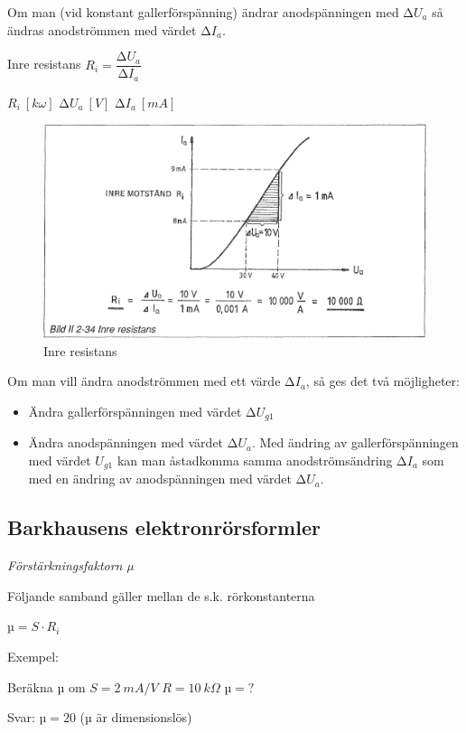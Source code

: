 Om man (vid konstant gallerförspänning) ändrar anodspänningen med
\(∆U_a\) så ändras anodströmmen med värdet \(∆I_a\).

Inre resistans \(R_i = \dfrac{∆U_a}{∆I_a}\)

\(R_i\ [k \omega]\)  \(∆U_a\ [V]\)  \(∆I_a\ [mA]\)

\begin{figure}[h]
\includegraphics[width=\textwidth]{images/bild_2_2-34}
\caption{Inre resistans}
\label{fig:BildII2-34}
\end{figure}

Om man vill ändra anodströmmen med ett värde \(∆I_a\), så ges det två
möjligheter:
\begin{itemize}
\item Ändra gallerförspänningen med värdet \(∆U_{g1}\)
\item Ändra anodspänningen med värdet \(∆U_a\).
  Med ändring av gallerförspänningen med värdet \(U_{g1}\) kan man åstadkomma
  samma anodströmsändring \(∆I_a\) som med en ändring av anodspänningen med
  värdet \(∆U_a\).
\end{itemize}

\subsection{Barkhausens elektronrörsformler}

\emph{Förstärkningsfaktorn µ}

Följande samband gäller mellan de s.k. rörkonstanterna

\(µ = S \cdot R_i\)

Exempel:

Beräkna µ om \(S = 2\ mA/V\) \(R = 10\ kΩ\) \(µ = ?\)

Svar: \(µ = 20\) (µ är dimensionslös)

